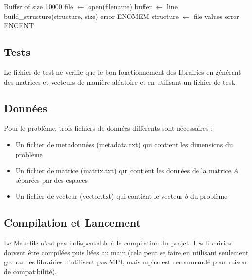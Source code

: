 \documentclass[11pt, a4paper]{article}
\begin{document}
\begin{framed}
    \begin{algorithmic}
            \State Buffer of size 10000
            \State file $\gets$ open(filename)
                    \State buffer $\gets$ line
                \EndWhile
                \State build\_structure(structure, size)
                    \State \Return error ENOMEM
                \EndIf
                \State structure $\gets$ file values
                \State {}
            \Else
                \State \Return error ENOENT
            \EndIf
        \EndFunction
    \end{algorithmic}
\end{framed}

\subsection{Tests}

Le fichier de test ne verifie que le bon fonctionnement des librairies en générant des matrices et vecteurs de manière aléatoire et en utilisant un fichier de test.

\subsection{Données}

Pour le problème, trois fichiers de données différents sont nécessaires :
\begin{itemize}
    \item Un fichier de metadonnées (metadata.txt) qui contient les dimensions du problème
    \item Un fichier de matrice (matrix.txt) qui contient les données de la matrice $A$ séparées par des espaces
    \item Un fichier de vecteur (vector.txt) qui contient le vecteur $b$ du problème
\end{itemize}

\subsection{Compilation et Lancement}

Le Makefile n'est pas indispensable à la compilation du projet.
Les librairies doivent \^etre compilées puis liées au main (cela peut se faire en utilisant seulement gcc car les librairies n'utilisent pas MPI, mais mpicc est recommandé pour raison de compatibilité).\\
\end{document}
